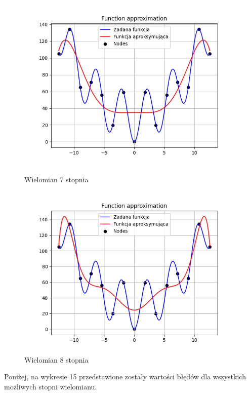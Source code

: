 \documentclass{article}
\begin{document}
\begin{figure}[H]
\begin{minipage}[b]{0.49\textwidth}
    \begin{minipage}[b]{\textwidth}
      \includegraphics[width=\textwidth]{img13.png}
      \caption{Wielomian 7 stopnia}
    \end{minipage}
    \vspace*{\fill}
    \begin{minipage}[b]{\textwidth}
      \includegraphics[width=\textwidth]{img14.png}
      \caption{Wielomian 8 stopnia}
    \end{minipage}
  \end{minipage}
\end{figure}

Poniżej, na wykresie 15 przedstawione zostały wartości błędów dla wszystkich możliwych stopni wielomianu.
\end{document}
